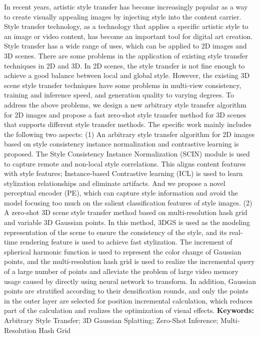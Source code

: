 \cleardoublepage
{}
In recent years, artistic style transfer has become increasingly popular as a way to create visually appealing images by injecting style into the content carrier. Style transfer technology, as a technology that applies a specific artistic style to an image or video content, has become an important tool for digital art creation. Style transfer has a wide range of uses, which can be applied to 2D images and 3D scenes. There are some problems in the application of existing style transfer techniques in 2D and 3D. In 2D scenes, the style transfer is not fine enough to achieve a good balance between local and global style. However, the existing 3D scene style transfer techniques have some problems in multi-view consistency, training and inference speed, and generation quality to varying degrees. To address the above problems, we design a new arbitrary style transfer algorithm for 2D images and propose a fast zero-shot style transfer method for 3D scenes that supports different style transfer methods. The specific work mainly includes the following two aspects:
\newline \indent(1) An arbitrary style transfer algorithm for 2D images based on style consistency instance normalization and contrastive learning is proposed. The Style Consistency Instance Normalization (SCIN) module is used to capture remote and non-local style correlations. This aligns content features with style features; Instance-based Contrastive learning (ICL) is used to learn stylization relationships and eliminate artifacts. And we propose a novel perceptual encoder (PE), which can capture style information and avoid the model focusing too much on the salient classification features of style images. 
\newline \indent(2) A zero-shot 3D scene style transfer method based on multi-resolution hash grid and variable 3D Gaussian points. In this method, 3DGS is used as the modeling representation of the scene to ensure the consistency of the style, and its real-time rendering feature is used to achieve fast stylization. The increment of spherical harmonic function is used to represent the color change of Gaussian points, and the multi-resolution hash grid is used to realize the incremental query of a large number of points and alleviate the problem of large video memory usage caused by directly using neural network to transform. In addition, Gaussian points are stratified according to their densification rounds, and only the points in the outer layer are selected for position incremental calculation, which reduces part of the calculation and realizes the optimization of visual effects.
\newline
{\textbf{Keywords:}} 
Arbitrary Style Transfer; 3D Gaussian Splatting; Zero-Shot Inference; Multi-Resolution Hash Grid
